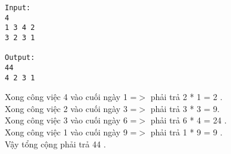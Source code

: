 \begin{verbatim}
Input:
4
1 3 4 2
3 2 3 1

Output:
44
4 2 3 1 

\end{verbatim}

Xong công việc 4 vào cuối ngày 1 =$>$ phải trả 2 * 1 = 2 .
\\Xong công việc 2 vào cuối ngày 3 =$>$ phải trả 3 * 3 = 9.
\\Xong công việc 3 vào cuối ngày 6 =$>$ phải trả 6 * 4 = 24 .
\\Xong công việc 1 vào cuối ngày 9 =$>$ phải trả 1 * 9 = 9 .
\\Vậy tổng cộng phải trả 44 .